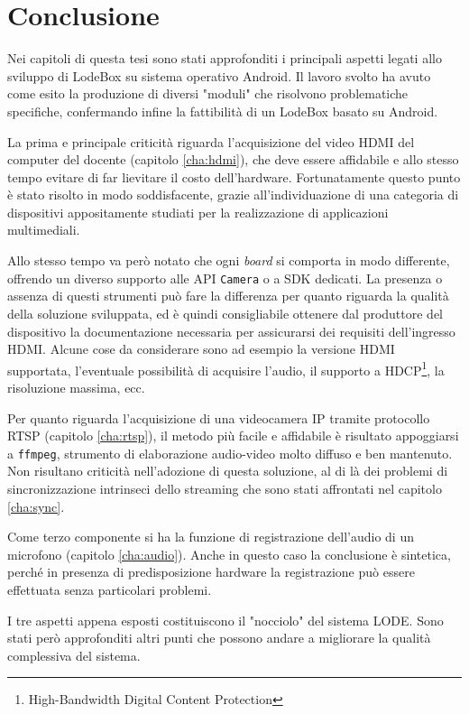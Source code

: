 \chapter{Conclusione}
\label{cha:conclusione}

Nei capitoli di questa tesi sono stati approfonditi i principali aspetti legati allo sviluppo di LodeBox su sistema operativo Android. Il lavoro svolto ha avuto come esito la produzione di diversi "moduli" che risolvono problematiche specifiche, confermando infine la fattibilità di un LodeBox basato su Android.

La prima e principale criticità riguarda l'acquisizione del video HDMI del computer del docente (capitolo \ref{cha:hdmi}), che deve essere affidabile e allo stesso tempo evitare di far lievitare il costo dell'hardware. Fortunatamente questo punto è stato risolto in modo soddisfacente, grazie all'individuazione di una categoria di dispositivi appositamente studiati per la realizzazione di applicazioni multimediali.

Allo stesso tempo va però notato che ogni \emph{board} si comporta in modo differente, offrendo un diverso supporto alle API \texttt{Camera} o a SDK dedicati. La presenza o assenza di questi strumenti può fare la differenza per quanto riguarda la qualità della soluzione sviluppata, ed è quindi consigliabile ottenere dal produttore del dispositivo la documentazione necessaria per assicurarsi dei requisiti dell'ingresso HDMI. Alcune cose da considerare sono ad esempio la versione HDMI supportata, l'eventuale possibilità di acquisire l'audio, il supporto a HDCP\footnote{High-Bandwidth Digital Content Protection}, la risoluzione massima, ecc.

Per quanto riguarda l'acquisizione di una videocamera IP tramite protocollo RTSP (capitolo \ref{cha:rtsp}), il metodo più facile e affidabile è risultato appoggiarsi a \texttt{ffmpeg}, strumento di elaborazione audio-video molto diffuso e ben mantenuto. Non risultano criticità nell'adozione di questa soluzione, al di là dei problemi di sincronizzazione intrinseci dello streaming che sono stati affrontati nel capitolo \ref{cha:sync}.

Come terzo componente si ha la funzione di registrazione dell'audio di un microfono (capitolo \ref{cha:audio}). Anche in questo caso la conclusione è sintetica, perché in presenza di predisposizione hardware la registrazione può essere effettuata senza particolari problemi.

I tre aspetti appena esposti costituiscono il "nocciolo" del sistema LODE. Sono stati però approfonditi altri punti che possono andare a migliorare la qualità complessiva del sistema.

